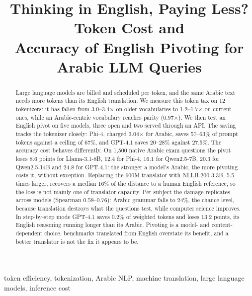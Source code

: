 \documentclass[conference,a4paper]{IEEEtran}
\begin{document}
\title{Thinking in English, Paying Less? Token Cost and\\Accuracy of English Pivoting for Arabic LLM Queries}

\author{
}

\maketitle

\begin{abstract}
Large language models are billed and scheduled per token, and the same Arabic
text needs more tokens than its English translation. We measure this token tax
on 12 tokenizers: it has fallen from 3.0--3.4$\times$ on older vocabularies to
1.2--1.7$\times$ on current ones, while an Arabic-centric vocabulary reaches
parity (0.97$\times$). We then test an English pivot on five models, three open
and two served through an API. The saving tracks the tokenizer closely: Phi-4,
charged 3.04$\times$ for Arabic, saves 57--63\% of prompt tokens against a
ceiling of 67\%, and GPT-4.1 saves 20--28\% against 27.5\%. The accuracy cost
behaves differently. On 1,500 native Arabic exam questions the pivot loses 8.6
points for Llama-3.1-8B, 12.4 for Phi-4, 16.1 for Qwen2.5-7B, 20.3 for
Qwen2.5-14B and 24.8 for GPT-4.1: the stronger a model's Arabic, the more
pivoting costs it, without exception. Replacing the 600M translator with
NLLB-200 3.3B, 5.5 times larger, recovers a median 16\% of the distance to a
human English reference, so the loss is not mainly one of translator capacity.
Per subject the damage replicates across models (Spearman 0.58--0.76): Arabic
grammar falls to 24\%, the chance level, because translation destroys what the
questions test, while computer science improves. In step-by-step mode GPT-4.1
saves 0.2\% of weighted tokens and loses 13.2 points, its English reasoning
running longer than its Arabic. Pivoting is a model- and content-dependent
choice, benchmarks translated from English overstate its benefit, and a better
translator is not the fix it appears to be.
\end{abstract}

\begin{IEEEkeywords}
token efficiency, tokenization, Arabic NLP, machine translation, large language
models, inference cost
\end{IEEEkeywords}
\end{document}
